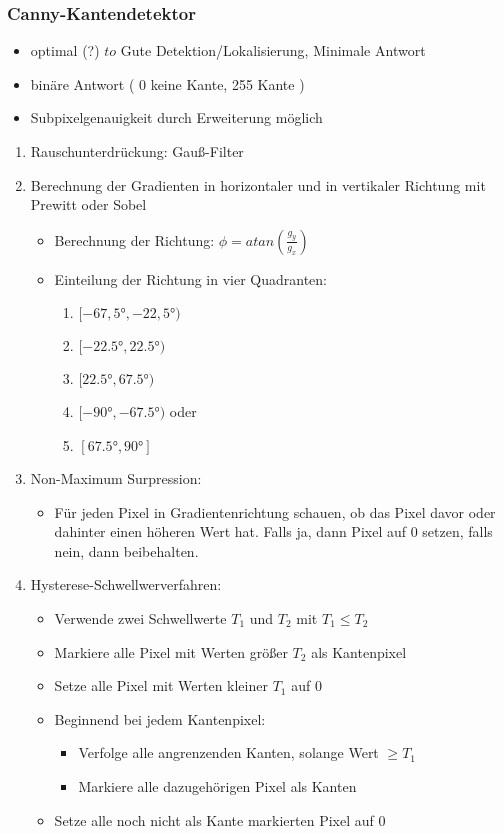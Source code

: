 \subsubsection{Canny-Kantendetektor}
\begin{itemize}
	\item optimal (?) $to$ Gute Detektion/Lokalisierung, Minimale Antwort
	\item binäre Antwort ( 0 keine Kante, 255 Kante )
	\item Subpixelgenauigkeit durch Erweiterung möglich
\end{itemize}
\begin{enumerate}
\item Rauschunterdrückung: Gauß-Filter
\item Berechnung der Gradienten in horizontaler und in vertikaler Richtung mit Prewitt oder Sobel
	\begin{itemize}
	\item Berechnung der Richtung: $\phi=atan(\frac{g_y}{g_x})$
	\item Einteilung der Richtung in vier Quadranten:
	\begin{enumerate}
		\item $[-67,5°,-22,5°)$
		\item $[-22.5°,22.5°)$
		\item $[22.5°,67.5°)$
		\item $[-90°,-67.5°)$ oder
		\item $[67.5°,90°]$
	\end{enumerate}
	\end{itemize}
\item Non-Maximum Surpression:
	\begin{itemize}
	\item Für jeden Pixel in Gradientenrichtung schauen, ob das Pixel davor oder dahinter einen höheren Wert hat. Falls ja, dann Pixel auf 0 setzen, falls nein, dann beibehalten.
	\end{itemize}
\item Hysterese-Schwellwerverfahren:
	\begin{itemize}
	\item Verwende zwei Schwellwerte \(T_1\) und \(T_2\) mit \(T_1 \leq T_2\)
	\item Markiere alle Pixel mit Werten größer \(T_2\) als Kantenpixel
	\item Setze alle Pixel mit Werten kleiner \(T_1\) auf 0
	\item Beginnend bei jedem Kantenpixel:
		\begin{itemize}
		\item Verfolge alle angrenzenden Kanten, solange Wert \(\geq T_1\)
		\item Markiere alle dazugehörigen Pixel als Kanten
		\end{itemize}
	\item Setze alle noch nicht als Kante markierten Pixel auf 0
	\end{itemize}
\end{enumerate}


